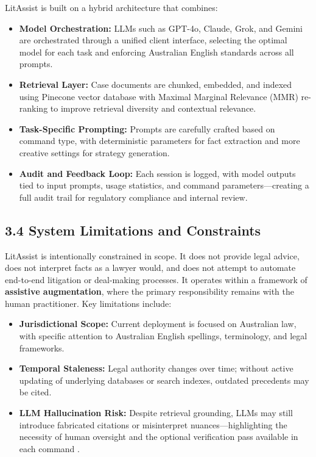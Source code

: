 \documentclass[12pt,a4paper]{article}
\begin{document}
LitAssist is built on a hybrid architecture that combines:

\begin{itemize}
\item \textbf{Model Orchestration:} LLMs such as GPT-4o, Claude, Grok, and Gemini are orchestrated through a unified client interface, selecting the optimal model for each task and enforcing Australian English standards across all prompts.

\item \textbf{Retrieval Layer:} Case documents are chunked, embedded, and indexed using Pinecone vector database with Maximal Marginal Relevance (MMR) re-ranking to improve retrieval diversity and contextual relevance.

\item \textbf{Task-Specific Prompting:} Prompts are carefully crafted based on command type, with deterministic parameters for fact extraction and more creative settings for strategy generation.

\item \textbf{Audit and Feedback Loop:} Each session is logged, with model outputs tied to input prompts, usage statistics, and command parameters—creating a full audit trail for regulatory compliance and internal review.
\end{itemize}

\subsection*{3.4 System Limitations and Constraints}

LitAssist is intentionally constrained in scope. It does not provide legal advice, does not interpret facts as a lawyer would, and does not attempt to automate end-to-end litigation or deal-making processes. It operates within a framework of \textbf{assistive augmentation}, where the primary responsibility remains with the human practitioner. Key limitations include:

\begin{itemize}
\item \textbf{Jurisdictional Scope:} Current deployment is focused on Australian law, with specific attention to Australian English spellings, terminology, and legal frameworks.

\item \textbf{Temporal Staleness:} Legal authority changes over time; without active updating of underlying databases or search indexes, outdated precedents may be cited.

\item \textbf{LLM Hallucination Risk:} Despite retrieval grounding, LLMs may still introduce fabricated citations or misinterpret nuances—highlighting the necessity of human oversight and the optional verification pass available in each command \cite{Zhao2021}.
\end{itemize}
\end{document}
